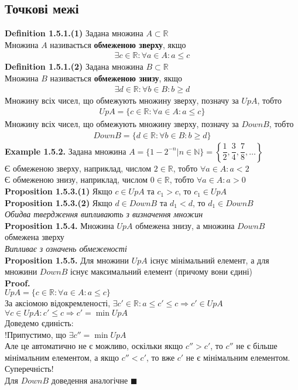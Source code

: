 \documentclass[a4paper, 14pt]{extarticle}
\def\bigline{\vspace{5mm}\\}
\def\ex#1{\textbf{Example {#1}}}
\def\bigline{\vspace{5mm}\\}
\def\qed{$\blacksquare$}
\begin{document}
\subsection{Точкові межі}
	\textbf{Definition 1.5.1.(1)} Задана множина $A \subset \mathbb{R}$\\
	Множина $A$ називається \textbf{обмеженою зверху}, якщо
	\begin{align*}
	\exists c \in \mathbb{R}: \forall a \in A: a \leq c
	\end{align*}
		\textbf{Definition 1.5.1.(2)} Задана множина $B \subset \mathbb{R}$\\
	Множина $B$ називається \textbf{обмеженою знизу}, якщо
	\begin{align*}
	\exists d \in \mathbb{R}: \forall b \in B: b \geq d
	\end{align*}
	Множину всіх чисел, що обмежують множину зверху, позначу за $UpA$, тобто
	\begin{align*}
	UpA = \{c \in \mathbb{R}: \forall a \in A: a \leq c \}
	\end{align*}
	Множину всіх чисел, що обмежують множину зверху, позначу за $DownB$, тобто
	\begin{align*}
	DownB = \{d \in \mathbb{R}: \forall b \in B: b \geq d \}
	\end{align*}
	\ex{1.5.2.} Задана множина $A = \{1-2^{-n} | n \in \mathbb{N}\} = \left\{\dfrac{1}{2}, \dfrac{3}{4}, \dfrac{7}{8}, \dots \right\}$\\
	Є обмеженою зверху, наприклад, числом $2 \in \mathbb{R}$, тобто $\forall a \in A: a < 2$\\
	Є обмеженою знизу, наприклад, числом $0 \in \mathbb{R}$, тобто $\forall a \in A: a > 0$
	\bigline
	\textbf{Proposition 1.5.3.(1)} Якщо $c \in UpA$ та $c_1 > c$, то $c_1 \in UpA$\\
	\textbf{Proposition 1.5.3.(2)} Якщо $d \in DownB$ та $d_1 < d$, то $d_1 \in DownB$\\
	\textit{Обидва твердження випливають з визначення множин}
	\bigline
	\textbf{Proposition 1.5.4.} Множина $UpA$ обмежена знизу, а множина $DownB$ обмежена зверху\\
	\textit{Випливає з означень обмеженості}
	\bigline
	\textbf{Proposition 1.5.5.} Для множини $UpA$ існує мінімальний елемент, а для множини $DownB$ існує максимальний елемент (причому вони єдині)\\
	\textbf{Proof.}\\
	$UpA = \{c \in \mathbb{R}: \forall a \in A: a \leq c \}$\\ За аксіомою відокремленості, $\exists c' \in \mathbb{R}: a \leq c' \leq c \Rightarrow c' \in UpA$\\
	$\forall c \in UpA: c' \leq c \Rightarrow c' = \min UpA$\\
	Доведемо єдиність:\\
	!Припустимо, що $\exists c'' = \min UpA$\\
	Але це автоматично не є можливо, оскільки якщо $c'' > c'$, то $c''$ не є більше мінімальним елементом, а якщо $c'' < c'$, то вже $c'$ не є мінімальним елементом. Суперечність!\\
	Для $DownB$ доведення аналогічне \qed
	\bigline
	
\end{document}
